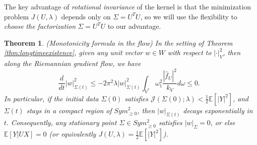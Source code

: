 \documentclass[a4paper]{article}
\newtheorem{thm}{Theorem}[section]
\theoremstyle{definition}
\newcommand{\E}{\mathbb{E}}
\newcommand{\1}{\mathbbm{1}}
\begin{document}
	
	
	
	
	The key advantage of \emph{rotational invariance} of the kernel is that the minimization problem $J(U,\lambda)$ depends only on $\Sigma=U^T U$, so we will use the flexibility to \emph{choose the factorization} $\Sigma=U^TU$ to our advantage. 
	
	
	
	
	
	
	
	\begin{thm}\label{thm:Gaussiannoisemonotonicity}
		(Monotonicity formula in the flow) In the setting of Theorem \ref{thm:longtimeexistence},
		given any unit vector $w\in W$ with respect to $|\cdot|_V^2$, then along the Riemannian gradient flow, we have
		\begin{equation}\label{eqn:monotonicity}
			\frac{d}{dt}|w|_{\Sigma(t)}^2 \leq - 2\pi^2\lambda|w|_{\Sigma(t)}^2 \int_{V^*} \omega_1^2 \frac{ |\hat{f}_U|^2}{k_V} d\omega\leq 0.
		\end{equation}
		In particular, if the initial data $\Sigma(0)$ satisfies $\mathcal{J}(\Sigma(0);\lambda)<\frac{1}{2}\E[|Y|^2]$, and $\Sigma(t)$ stays in a compact region of $Sym^2_{\geq 0}$, then $|w|_{\Sigma(t)}$ decays exponentially in $t$. 
		Consequently, any stationary point $\Sigma\in Sym^2_{\geq 0}$ satisfies $|w|_\Sigma=0$, or else $\E[Y|UX]=0$ (or equivalently $J(U,\lambda)=\frac{1}{2}\E[|Y|^2]$).
		
	\end{thm}
	
	
	
	
	
\end{document}
